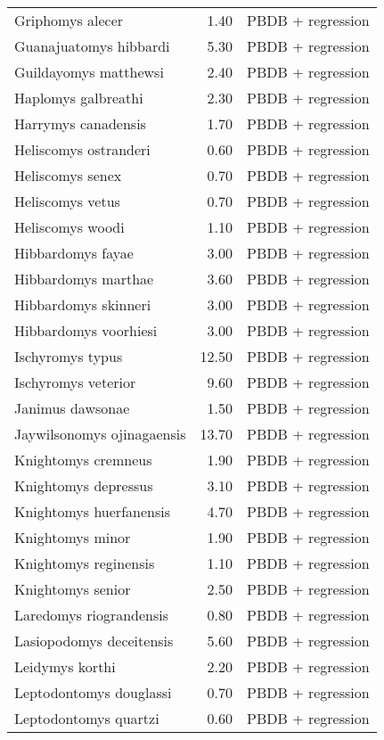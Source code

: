 \begin{table}[ht]
\begin{tabular}{lrl}
  Griphomys alecer & 1.40 & PBDB + regression \\ 
  Guanajuatomys hibbardi & 5.30 & PBDB + regression \\ 
  Guildayomys matthewsi & 2.40 & PBDB + regression \\ 
  Haplomys galbreathi & 2.30 & PBDB + regression \\ 
  Harrymys canadensis & 1.70 & PBDB + regression \\ 
  Heliscomys ostranderi & 0.60 & PBDB + regression \\ 
  Heliscomys senex & 0.70 & PBDB + regression \\ 
  Heliscomys vetus & 0.70 & PBDB + regression \\ 
  Heliscomys woodi & 1.10 & PBDB + regression \\ 
  Hibbardomys fayae & 3.00 & PBDB + regression \\ 
  Hibbardomys marthae & 3.60 & PBDB + regression \\ 
  Hibbardomys skinneri & 3.00 & PBDB + regression \\ 
  Hibbardomys voorhiesi & 3.00 & PBDB + regression \\ 
  Ischyromys typus & 12.50 & PBDB + regression \\ 
  Ischyromys veterior & 9.60 & PBDB + regression \\ 
  Janimus dawsonae & 1.50 & PBDB + regression \\ 
  Jaywilsonomys ojinagaensis & 13.70 & PBDB + regression \\ 
  Knightomys cremneus & 1.90 & PBDB + regression \\ 
  Knightomys depressus & 3.10 & PBDB + regression \\ 
  Knightomys huerfanensis & 4.70 & PBDB + regression \\ 
  Knightomys minor & 1.90 & PBDB + regression \\ 
  Knightomys reginensis & 1.10 & PBDB + regression \\ 
  Knightomys senior & 2.50 & PBDB + regression \\ 
  Laredomys riograndensis & 0.80 & PBDB + regression \\ 
  Lasiopodomys deceitensis & 5.60 & PBDB + regression \\ 
  Leidymys korthi & 2.20 & PBDB + regression \\ 
  Leptodontomys douglassi & 0.70 & PBDB + regression \\ 
  Leptodontomys quartzi & 0.60 & PBDB + regression \\ 

\end{tabular}
\end{table}

